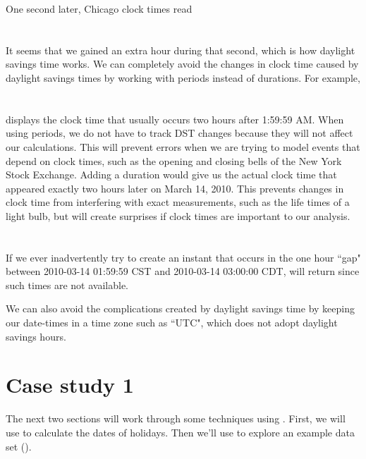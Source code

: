 \documentclass[article]{jss}
\begin{document}
One second later, Chicago clock times read\\

\\
\\

It seems that we gained an extra hour during that second, which is how daylight savings time works. We can completely avoid the changes in clock time caused by daylight savings times by working with periods instead of durations. For example,\\

\\
\\

displays the clock time that usually occurs two hours after 1:59:59 AM. When using periods, we do not have to track DST changes because they will not affect our calculations. This will prevent errors when we are trying to model events that depend on clock times, such as the opening and closing bells of the New York Stock Exchange. 
Adding a duration would give us the actual clock time that appeared exactly two hours later on March 14, 2010. This prevents changes in clock time from interfering with exact measurements, such as the life times of a light bulb, but will create surprises if clock times are important to our analysis. \\

\\
\\

If we ever inadvertently try to create an instant that occurs in the one hour ``gap" between 2010-03-14 01:59:59 CST  and 2010-03-14 03:00:00 CDT,  will return  since such times are not available.

We can also avoid the complications created by daylight savings time by keeping our date-times in a time zone such as ``UTC", which does not adopt daylight savings hours.

\section{Case study 1}

The next two sections will work through some techniques using . First, we will use  to calculate the dates of  holidays. Then we'll use  to explore an example data set ().
\end{document}
